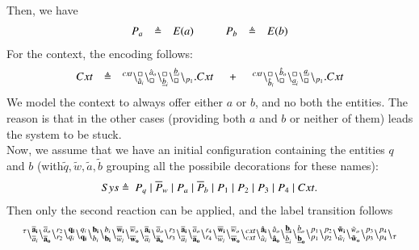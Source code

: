 Then, we have
\[
\begin{array}{lcl @{\hspace{1cm}}lcl}
P_a & \defeq & E(a) & P_b& \defeq & E(b)\\
\end{array}
\]
For the context, the encoding follows:
\[
\begin{array}{lcl @{\hspace{0.5cm}}c@{\hspace{0.5cm}} l}
Cxt &\defeq &  \startchain{cxt}\chainedlink{\hat{a}_i}{\noact}\chainedlink{\noact}{\hat{a}_o}\chainedlink{\underline{b}_i}{\noact}\chainedlink{\noact}{\underline{b}_i}\chainend{p_1}.Cxt
&+
&\startchain{cxt}\chainedlink{\hat{b}_i}{\noact}\chainedlink{\noact}{\hat{b}_o}\chainedlink{\underline{a}_i}{\noact}\chainedlink{\noact}{\underline{a}_i}\chainend{p_1}.Cxt\\
\end{array}
\]
We model the context to always offer either  $a$ or $b$, and no both the entities. The reason is that in
the other cases (providing both $a$ and $b$ or neither of them) leads the system to be stuck.\\
Now, we assume that we have an initial configuration containing the entities $q$ and $b$ (with$\tilde{q},\tilde{w},\tilde{a},\tilde{b}$ grouping all the possibile decorations for these names):
\[
\begin{array}{lcl}
Sys  \defeq \ %
 P_q \mid \overline{P}_w  \mid  P_a  \mid \overline{P}_b  \mid  P_1  \mid  P_2  \mid  P_3  \mid P_4  \mid Cxt.
\end{array}
\] 
Then only the second reaction can be applied, and the label transition follows
{\small
\[
\begin{array}{l}
 {}^{\tau}\backslash_{\overline{a}_i}^{\bf  \overline{a}_i}\backslash_{\bf \overline{a}_o}^{\overline{a}_o}\backslash_{r_2}^{r_2}\backslash_{q_i}^{\bf q_i}\backslash_{\bf q_i}^{q_i}\backslash_{b_i}^{\bf b_i}\backslash_{\bf b_i}^{b_i}\backslash_{\overline{w}_i}^{\bf \overline{w}_i}\backslash_{\bf \overline{w}_o}^{\overline{w}_o}\backslash_{\overline{a}_i}^{\bf \overline{a}_i}\backslash_{\bf \overline{a}_o}^{\overline{a}_o}\backslash_{r_3}^{r_3}\backslash_{\overline{a}_i}^{\bf \overline{a}_i}\backslash_{\bf \overline{a}_o}^{\overline{a}_o}\backslash_{r_4}^{r_4}\backslash_{\overline{w}_i}^{\bf \overline{w}_i}\backslash_{\bf \overline{w}_o}^{\overline{w}_o}\backslash_{cxt}^{cxt}\backslash_{\hat{a}_i}^{\bf \hat{a}_i}\backslash_{\bf \hat{a}_o}^{\hat{a}_o}\backslash_{\underline{b}_i}^{\bf \underline{b}_i}\backslash_{\bf \underline{b}_o}^{\underline{b}_o}\backslash_{p_1}^{p_1}\backslash_{p_2}^{p_2}\backslash_{\tilde{w}_i}^{\bf \tilde{w}_i}\backslash_{\bf \tilde{w}_o}^{\tilde{w}_o}\backslash_{p_3}^{p_3}\backslash_{p_4}^{p_4}\backslash_{\tau}
\end{array}
\]}
